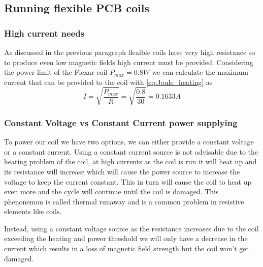 \subsection{Running flexible PCB coils}

\subsubsection{High current needs}
As discussed in the previous paragraph flexible coils have very high resistance so to produce even low magnetic fields high current must be provided.
Considering the power limit of the Flexar coil $P_{max} = 0.8W$ we can calculate the maximum current that can be provided to the coil with \ref{eq:Joule_heating} as
\begin{equation}
    I = \sqrt{\frac{P_{max}}{R}} = \sqrt{\frac{0.8}{30}} = 0.1633A
\end{equation}

\subsubsection{Constant Voltage vs Constant Current power supplying}
To power our coil we have two options, we can either provide a constant voltage or a constant current.
Using a constant current source is not advisable due to the heating problem of the coil, at high currents as the coil is run it will heat up and its resistance will increase which will cause the power source to increase the voltage to keep the current constant.
This in turn will cause the coil to heat up even more and the cycle will continue until the coil is damaged.
This phenonemon is called thermal runaway and is a common problem in resistive elements like coils.

Instead, using a constant voltage source as the resistance increases due to the coil exceeding the heating and power threshold we will only have a decrease in the current which results in a loss of magnetic field strength but the coil won't get damaged.


